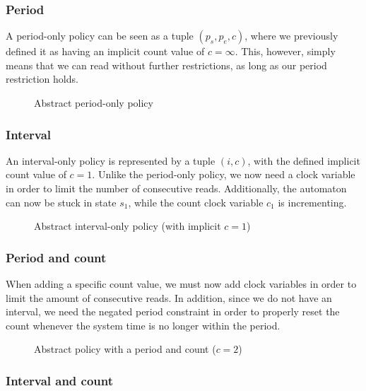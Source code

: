 \subsubsection{Period}
A period-only policy can be seen as a tuple $(p_s, p_e, c)$, where we previously defined it as having an implicit count value of $c = \infty$.
This, however, simply means that we can read without further restrictions, as long as our period restriction holds.

\begin{figure}[H]
  \centering
  
  \caption{Abstract period-only policy}
\end{figure}

\subsubsection{Interval}
An interval-only policy is represented by a tuple $(i, c)$, with the defined implicit count value of $c = 1$.
Unlike the period-only policy, we now need a clock variable in order to limit the number of consecutive reads.
Additionally, the automaton can now be stuck in state $s_1$, while the count clock variable $c_1$ is incrementing.

\begin{figure}[H]
  \centering
  
  \caption{Abstract interval-only policy (with implicit $c = 1$)}
\end{figure}

\subsubsection{Period and count}
When adding a specific count value, we must now add clock variables in order to limit the amount of consecutive reads.
In addition, since we do not have an interval, we need the negated period constraint in order to properly reset the count whenever the system time is no longer within the period.

\begin{figure}[H]
  \centering
  
  \caption{Abstract policy with a period and count ($c = 2$)}
\end{figure}

\subsubsection{Interval and count}


